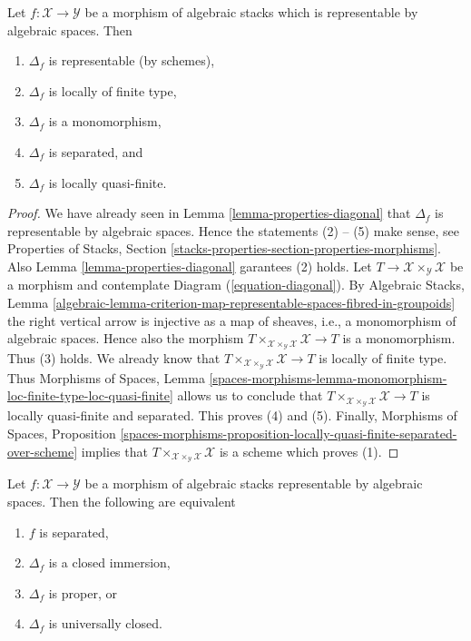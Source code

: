 \begin{lemma}
\label{lemma-properties-diagonal-representable}
Let $f : \mathcal{X} \to \mathcal{Y}$ be a morphism of algebraic stacks
which is representable by algebraic spaces. Then
\begin{enumerate}
\item $\Delta_f$ is representable
(by schemes),
\item $\Delta_f$ is locally of finite type,
\item $\Delta_f$ is a monomorphism,
\item $\Delta_f$ is separated, and
\item $\Delta_f$ is locally quasi-finite.
\end{enumerate}
\end{lemma}

\begin{proof}
We have already seen in
Lemma \ref{lemma-properties-diagonal}
that $\Delta_f$ is representable by algebraic
spaces. Hence the statements (2) -- (5) make sense, see
Properties of Stacks,
Section \ref{stacks-properties-section-properties-morphisms}.
Also
Lemma \ref{lemma-properties-diagonal}
garantees (2) holds.
Let $T \to \mathcal{X} \times_{\mathcal{Y}} \mathcal{X}$ be a morphism
and contemplate Diagram (\ref{equation-diagonal}). By
Algebraic Stacks, Lemma
\ref{algebraic-lemma-criterion-map-representable-spaces-fibred-in-groupoids}
the right vertical arrow is injective as a map of sheaves, i.e., a
monomorphism of algebraic spaces. Hence also the morphism
$T \times_{\mathcal{X} \times_{\mathcal{Y}} \mathcal{X}} \mathcal{X} \to T$
is a monomorphism. Thus (3) holds. We already know that
$T \times_{\mathcal{X} \times_{\mathcal{Y}} \mathcal{X}} \mathcal{X} \to T$
is locally of finite type. Thus
Morphisms of Spaces, Lemma
\ref{spaces-morphisms-lemma-monomorphism-loc-finite-type-loc-quasi-finite}
allows us to conclude that
$T \times_{\mathcal{X} \times_{\mathcal{Y}} \mathcal{X}} \mathcal{X} \to T$
is locally quasi-finite and separated. This proves (4) and (5).
Finally,
Morphisms of Spaces, Proposition
\ref{spaces-morphisms-proposition-locally-quasi-finite-separated-over-scheme}
implies that
$T \times_{\mathcal{X} \times_{\mathcal{Y}} \mathcal{X}} \mathcal{X}$
is a scheme which proves (1).
\end{proof}

\begin{lemma}
\label{lemma-representable-separated-diagonal-closed}
Let $f : \mathcal{X} \to \mathcal{Y}$ be a morphism of algebraic stacks
representable by algebraic spaces. Then the following are equivalent
\begin{enumerate}
\item $f$ is separated,
\item $\Delta_f$ is a closed immersion,
\item $\Delta_f$ is proper, or
\item $\Delta_f$ is universally closed.
\end{enumerate}
\end{lemma}

